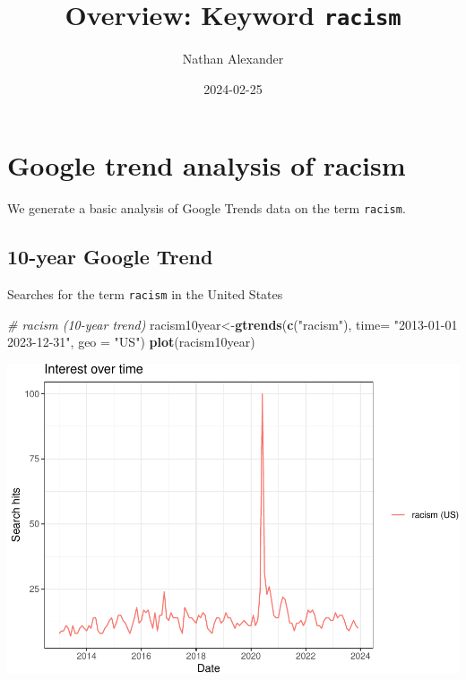 \documentclass[
]{article}
\title{Overview: Keyword \texttt{racism}}
\author{Nathan Alexander}
\date{2024-02-25}
\newenvironment{Shaded}{\begin{snugshade}}{\end{snugshade}}
\newcommand{\AttributeTok}[1]{\textcolor[rgb]{0.13,0.29,0.53}{#1}}
\newcommand{\CommentTok}[1]{\textcolor[rgb]{0.56,0.35,0.01}{\textit{#1}}}
\newcommand{\FunctionTok}[1]{\textcolor[rgb]{0.13,0.29,0.53}{\textbf{#1}}}
\newcommand{\NormalTok}[1]{#1}
\newcommand{\OtherTok}[1]{\textcolor[rgb]{0.56,0.35,0.01}{#1}}
\newcommand{\StringTok}[1]{\textcolor[rgb]{0.31,0.60,0.02}{#1}}
\begin{document}
\maketitle

\hypertarget{google-trend-analysis-of-racism}{%
\section{Google trend analysis of
racism}\label{google-trend-analysis-of-racism}}

We generate a basic analysis of Google Trends data on the term
\texttt{racism}.

\hypertarget{year-google-trend}{%
\subsection{10-year Google Trend}\label{year-google-trend}}

Searches for the term \texttt{racism} in the United States

\begin{Shaded}
\begin{Highlighting}[]
\CommentTok{\# racism (10{-}year trend)}
\NormalTok{racism10year}\OtherTok{\textless{}{-}}\FunctionTok{gtrends}\NormalTok{(}\FunctionTok{c}\NormalTok{(}\StringTok{"racism"}\NormalTok{), }\AttributeTok{time=} \StringTok{"2013{-}01{-}01 2023{-}12{-}31"}\NormalTok{, }\AttributeTok{geo =} \StringTok{"US"}\NormalTok{)}
\FunctionTok{plot}\NormalTok{(racism10year)}
\end{Highlighting}
\end{Shaded}

\includegraphics{overview-keyword-racism_files/figure-latex/unnamed-chunk-2-1.pdf}
\end{document}
